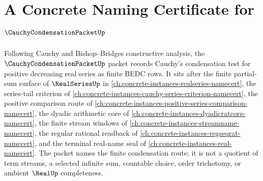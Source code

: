 \chapter{A Concrete Naming Certificate for $\CauchyCondensationPacketUp$}
\label{ch:concrete-instances-cauchy-condensation-packet-namecert}

Following Cauchy and Bishop--Bridges constructive analysis, the $\CauchyCondensationPacketUp$ packet records Cauchy's condensation test for positive decreasing real series as finite BEDC rows. It sits after the finite partial-sum surface of $\RealSeriesUp$ in \autoref{ch:concrete-instances-realseries-namecert}, the series-tail criterion of \autoref{ch:concrete-instances-cauchy-series-criterion-namecert}, the positive comparison route of \autoref{ch:concrete-instances-positive-series-comparison-namecert}, the dyadic arithmetic core of \autoref{ch:concrete-instances-dyadicratcore-namecert}, the finite stream windows of \autoref{ch:concrete-instances-streamname-namecert}, the regular rational readback of \autoref{ch:concrete-instances-regseqrat-namecert}, and the terminal real-name seal of \autoref{ch:concrete-instances-real-namecert}. The packet names the finite condensation route; it is not a quotient of term streams, a selected infinite sum, countable choice, order trichotomy, or ambient $\RealUp$ completeness.

